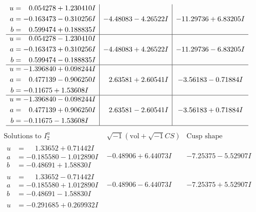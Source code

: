 \documentclass[1p]{elsarticle_modified}
\theoremstyle{definition}
\newcommand{\I}{\sqrt{-1}}
\begin{document}
$$\begin{array}{c|c|c}
\begin{aligned}
u &= \phantom{-}0.054278 + 1.230410 I \\
a &= -0.163473 - 0.310256 I \\
b &= \phantom{-}0.599474 + 0.188835 I\end{aligned}
 & -4.48083 - 4.26522 I & -11.29736 + 6.83205 I \\ \hline\begin{aligned}
u &= \phantom{-}0.054278 - 1.230410 I \\
a &= -0.163473 + 0.310256 I \\
b &= \phantom{-}0.599474 - 0.188835 I\end{aligned}
 & -4.48083 + 4.26522 I & -11.29736 - 6.83205 I \\ \hline\begin{aligned}
u &= -1.396840 + 0.098244 I \\
a &= \phantom{-}0.477139 - 0.906250 I \\
b &= -0.11675 + 1.53608 I\end{aligned}
 & \phantom{-}2.63581 + 2.60541 I & -3.56183 - 0.71884 I \\ \hline\begin{aligned}
u &= -1.396840 - 0.098244 I \\
a &= \phantom{-}0.477139 + 0.906250 I \\
b &= -0.11675 - 1.53608 I\end{aligned}
 & \phantom{-}2.63581 - 2.60541 I & -3.56183 + 0.71884 I\\
 \hline 
 \end{array}$$\newpage$$\begin{array}{c|c|c}  
\text{Solutions to }I^u_{2}& \I (\text{vol} + \sqrt{-1}CS) & \text{Cusp shape}\\
 \hline 
\begin{aligned}
u &= \phantom{-}1.33652 + 0.71442 I \\
a &= -0.185580 - 1.012890 I \\
b &= -0.48691 + 1.58830 I\end{aligned}
 & -0.48906 + 6.44073 I & -7.25375 - 5.52907 I \\ \hline\begin{aligned}
u &= \phantom{-}1.33652 - 0.71442 I \\
a &= -0.185580 + 1.012890 I \\
b &= -0.48691 - 1.58830 I\end{aligned}
 & -0.48906 - 6.44073 I & -7.25375 + 5.52907 I \\ \hline\begin{aligned}
u &= -0.291685 + 0.269932 I \\

\end{aligned}
\end{array}$$
\end{document}
